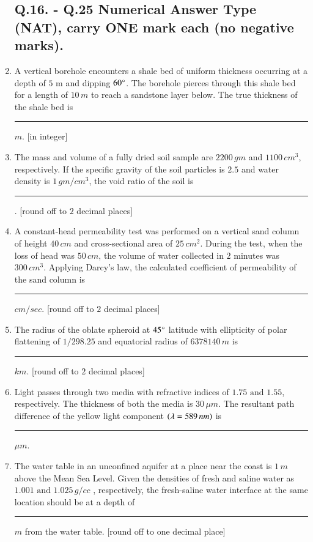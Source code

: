 \documentclass[journal,12pt,onecolumn]{IEEEtran}
\theoremstyle{remark}
\begin{document}
\begin{enumerate}
    \subsection*{Q.16. - Q.25 Numerical Answer Type (NAT), carry ONE mark each (no negative marks).}
    
    \item A vertical borehole encounters a shale bed of uniform thickness occurring at a depth of $5$ m and dipping $60\degree$. The borehole pierces through this shale bed for a length of $10\, m$ to reach a sandstone layer below. The true thickness of the shale bed is \rule{3cm}{0.15mm} $m$. [in integer] \hfill{}
    
    \item The mass and volume of a fully dried soil sample are $2200\,gm$ and $1100\,cm^3$, respectively. If the specific gravity of the soil particles is $2.5$ and water density is $1\,gm/cm^3$, the void ratio of the soil is \rule{3cm}{0.15mm}. [round off to $2$ decimal places]\hfill{}
    
    \item A constant-head permeability test was performed on a vertical sand column of height $40\,cm$ and cross-sectional area of $25\,cm^2$. During the test, when the loss of head was $50\,cm$, the volume of water collected in $2$ minutes was $300\,cm^3$. Applying Darcy's law, the calculated coefficient of permeability of the sand column is \rule{3cm}{0.15mm} $cm/sec$. [round off to $2$ decimal places] \hfill{}
    
    \item The radius  of the oblate spheroid at $45\degree$ latitude with ellipticity of polar flattening of $1/298.25$ and equatorial radius of $6378140\,m$ is \rule{3cm}{0.15mm} $km$. [round off to $2$ decimal places] \hfill{}
    
    \item Light passes through two media with refractive indices of $1.75\text{ and }1.55$, respectively. The thickness of both the media is $30\,\mu m$. The resultant path difference of the yellow light component $\left(\lambda = 589\,nm\right)$ is \rule{3cm}{0.15mm} $\mu m$. \hfill{}
    
    \item The water table in an unconfined aquifer at a place near the coast is $1\,m$ above the Mean Sea Level. Given the densities of fresh and saline water as $1.001\text{ and }1.025 \,g/cc$ , respectively, the fresh-saline water interface at the same location should be at a depth of \rule{3cm}{0.15mm} $m$ from the water table. [round off to one decimal place] \hfill{}
    

\end{enumerate}
\end{document}
